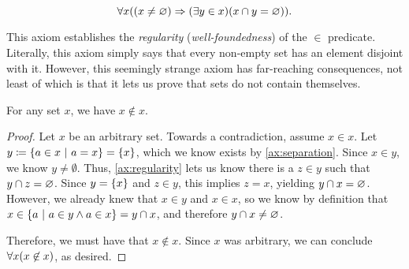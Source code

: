 \begin{axiom}[Regularity]\label{ax:regularity}
    \vspace{-\abovedisplayskip}
    \[
        \forall x \pn*{\pn*{x \neq \emptyset} \implies \pn*{\exists y \in x}\pn*{x \intersect y = \emptyset}}.
    \]

    This axiom establishes the \emph{regularity} (\aka \emph{well-foundedness}) of the \(\in\) predicate.
    Literally, this axiom simply says that every non-empty set has an element disjoint with it.
    However, this seemingly strange axiom has far-reaching consequences,
    not least of which is that it lets us prove that sets do not contain themselves.
\end{axiom}

\begin{theorem}
    For any set \(x\), we have \(x \not \in x\).
\end{theorem}
\begin{proof}
    Let \(x\) be an arbitrary set.
    Towards a contradiction, assume \(x \in x\).
    Let \(y \defn \set*{a \in x \suchthat a = x} = \set*{x}\), which we know exists by \autoref{ax:separation}.
    Since \(x \in y\), we know \(y \neq \emptyset\).
    Thus, \autoref{ax:regularity} lets us know there is a \(z \in y\) such that \(y \cap z = \varnothing\).
    Since \(y = \set*{x}\) and \(z \in y\), this implies \(z = x\), yielding \(y \cap x = \varnothing\).
    However, we already knew that \(x \in y\) and \(x \in x\),
    so we know by definition that \(x \in \set*{a \suchthat a \in y \meet a \in x} = y \intersect x\),
    and therefore \(y \cap x \neq \varnothing\). \contradiction

    Therefore, we must have that \(x \not \in x\).
    Since \(x\) was arbitrary, we can conclude \(\forall x \pn*{x \not \in x}\), as desired.
\end{proof}
% 

